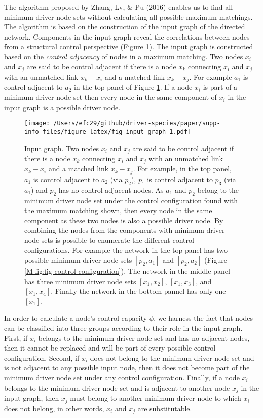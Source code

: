 \documentclass[a4paper]{artikel1}
\theoremstyle{definition}
\theoremstyle{definition}
\theoremstyle{definition}
\theoremstyle{remark}
\begin{document}
The algorithm proposed by Zhang, Lv, \& Pu (2016) enables us to find all
minimum driver node sets without calculating all possible maximum
matchings. The algorithm is based on the construction of the input graph
of the directed network. Components in the input graph reveal the
correlations between nodes from a structural control perspective (Figure
\ref{fig:fig-input-graph}). The input graph is constructed based on the
\emph{control adjacency} of nodes in a maximum matching. Two nodes
\(x_i\) and \(x_j\) are said to be control adjacent if there is a node
\(x_k\) connecting \(x_i\) and \(x_j\) with an unmatched link
\(x_k-x_i\) and a matched link \(x_k-x_j\). For example \(a_1\) is
control adjacent to \(a_2\) in the top panel of Figure
\ref{fig:fig-input-graph}. If a node \(x_i\) is part of a minimum driver
node set then every node in the same component of \(x_i\) in the input
graph is a possible driver node.

\begin{figure}
\centering
\texttt{[image: /Users/efc29/github/driver-species/paper/supp-info\_files/figure-latex/fig-input-graph-1.pdf]}
\caption{\label{fig:fig-input-graph}Input graph. Two nodes \(x_i\) and
\(x_j\) are said to be control adjacent if there is a node \(x_k\)
connecting \(x_i\) and \(x_j\) with an unmatched link \(x_k-x_i\) and a
matched link \(x_k-x_j\). For example, in the top panel, \(a_1\) is
control adjacent to \(a_2\) (via \(p_2\)), \(p_1\) is control adjacent
to \(p_3\) (via \(a_1\)) and \(p_2\) has no control adjacent nodes. As
\(a_1\) and \(p_2\) belong to the minimum driver node set under the
control configuration found with the maximum matching shown, then every
node in the same component as these two nodes is also a possible driver
node. By combining the nodes from the components with minimum driver
node sets is possible to enumerate the different control configurations.
For example the network in the top panel has two possible minimum driver
node sets \([p_2, a_1]\) and \([p_2, a_2]\) (Figure
\ref{M-fig:fig-control-configuration}). The network in the middle panel
has three minimum driver node sets \([x_1, x_2]\), \([x_1, x_3]\), and
\([x_1, x_4]\). Finally the network in the bottom pannel has only one
\([x_1]\).}
\end{figure}

In order to calculate a node's control capacity \(\phi\), we harness the
fact that nodes can be classified into three groups according to their
role in the input graph. First, if \(x_i\) belongs to the minimum driver
node set and has no adjacent nodes, then it cannot be replaced and will
be part of every possible control configuration. Second, if \(x_i\) does
not belong to the minimum driver node set and is not adjacent to any
possible input node, then it does not become part of the minimum driver
node set under any control configuration. Finally, if a node \(x_i\)
belongs to the minimum driver node set and is adjacent to another node
\(x_j\) in the input graph, then \(x_j\) must belong to another minimum
driver node to which \(x_i\) does not belong, in other words, \(x_i\)
and \(x_j\) are substitutable.
\end{document}
